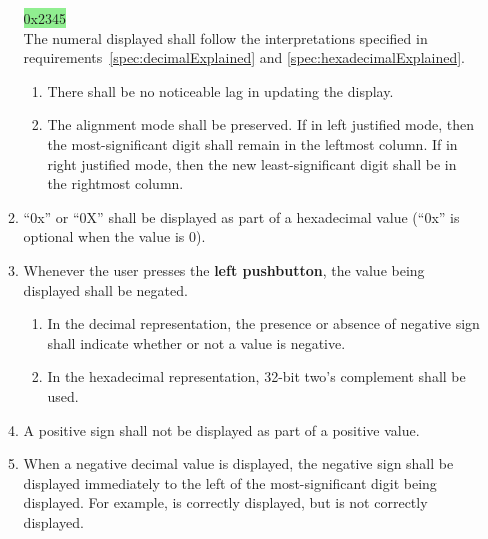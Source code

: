 \begin{enumerate}
\begin{enumerate}
{                \colorbox{LightGreen}{\phantom{xxxxxxxxxx}0x2345}
            } \\
            The numeral displayed shall follow the interpretations specified in requirements~\ref{spec:decimalExplained} and \ref{spec:hexadecimalExplained}.
            \begin{enumerate}
                \item There shall be no noticeable lag in updating the display.
                \item The alignment mode shall be preserved.
                    If in left justified mode, then the most-significant digit shall remain in the leftmost column.
                    If in right justified mode, then the new least-significant digit shall be in the rightmost column.
            \end{enumerate}
        \item ``0x'' or ``0X'' shall be displayed as part of a hexadecimal value (``0x'' is optional when the value is 0).
        \item Whenever the user presses the \textbf{left pushbutton}, the value being displayed shall be negated.
            \begin{enumerate}
                \item In the decimal representation, the presence or absence of negative sign shall indicate whether or not a value is negative.
                \item In the hexadecimal representation, 32-bit two's complement shall be used.
            \end{enumerate}
        \item A positive sign shall not be displayed as part of a positive value.
        \item When a negative decimal value is displayed, the negative sign shall be displayed immediately to the left of the most-significant digit being displayed.
            For example,  is correctly displayed, but  is not correctly displayed.
            \begin{enumerate}

\end{enumerate}
\end{enumerate}
\end{enumerate}
